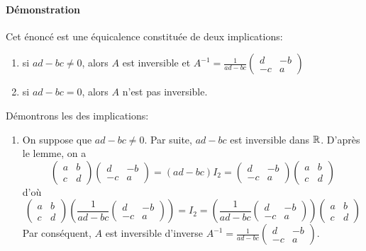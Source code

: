 \paragraph{Démonstration} Cet énoncé est une équicalence constituée de deux implications:
\begin{enumerate}
  \item si $a d - b c \neq 0$, alors $A$ est inversible et $A^{-1} = \frac{1}{ad-bc} \begin{pmatrix} d & -b \\ -c & a \end{pmatrix}$
  
  \item si $a d - b c = 0$, alors $A$ n'est pas inversible.
\end{enumerate}
Démontrons les des implications:
\begin{enumerate}
  \item On suppose que $a d - b c \neq 0$. Par suite, $a d - b c$ est inversible dans $\mathbb{R}$. D'après le lemme, on a
    $$\begin{pmatrix} a & b \\ c & d \end{pmatrix} \begin{pmatrix} d & -b \\ -c & a \end{pmatrix} 
      = (a d - b c) I_2 
      =  \begin{pmatrix} d & -b \\ -c & a \end{pmatrix} \begin{pmatrix} a & b \\ c & d \end{pmatrix}$$
    d'où
    $$\begin{pmatrix} a & b \\ c & d \end{pmatrix} \left( \frac{1}{a d - b c} \begin{pmatrix} d & -b \\ -c & a \end{pmatrix} \right) 
      = I_2 
      = \left( \frac{1}{a d - b c} \begin{pmatrix} d & -b \\ -c & a \end{pmatrix} \right) \begin{pmatrix} a & b \\ c & d \end{pmatrix}$$
    Par conséquent, $A$ est inversible d'inverse $A^{-1}=\frac{1}{a d - b c}\begin{pmatrix} d & -b \\ -c & a\end{pmatrix}$.
    

\end{enumerate}
